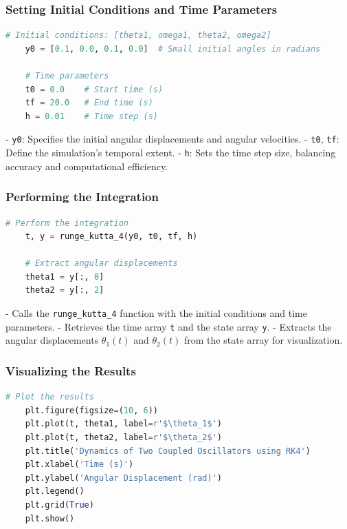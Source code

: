 \documentclass[12pt]{report} %
\begin{document}
    \subsubsection{Setting Initial Conditions and Time Parameters}
    
    \begin{lstlisting}[language=Python, caption={Initial Conditions and Time Parameters}, label={lst:initial_conditions}]
    # Initial conditions: [theta1, omega1, theta2, omega2]
    y0 = [0.1, 0.0, 0.1, 0.0]  # Small initial angles in radians
    
    # Time parameters
    t0 = 0.0    # Start time (s)
    tf = 20.0   # End time (s)
    h = 0.01    # Time step (s)
    \end{lstlisting}
    
    - \texttt{y0}: Specifies the initial angular displacements and angular velocities.
    - \texttt{t0}, \texttt{tf}: Define the simulation's temporal extent.
    - \texttt{h}: Sets the time step size, balancing accuracy and computational efficiency.
    
    \subsubsection{Performing the Integration}
    
    \begin{lstlisting}[language=Python, caption={Performing the Integration}, label={lst:perform_integration}]
    # Perform the integration
    t, y = runge_kutta_4(y0, t0, tf, h)
    
    # Extract angular displacements
    theta1 = y[:, 0]
    theta2 = y[:, 2]
    \end{lstlisting}
    
    - Calls the \texttt{runge\_kutta\_4} function with the initial conditions and time parameters.
    - Retrieves the time array \texttt{t} and the state array \texttt{y}.
    - Extracts the angular displacements \( \theta_1(t) \) and \( \theta_2(t) \) from the state array for visualization.
    
    \subsubsection{Visualizing the Results}
    
    \begin{lstlisting}[language=Python, caption={Plotting the Results}, label={lst:plot_results}]
    # Plot the results
    plt.figure(figsize=(10, 6))
    plt.plot(t, theta1, label=r'$\theta_1$')
    plt.plot(t, theta2, label=r'$\theta_2$')
    plt.title('Dynamics of Two Coupled Oscillators using RK4')
    plt.xlabel('Time (s)')
    plt.ylabel('Angular Displacement (rad)')
    plt.legend()
    plt.grid(True)
    plt.show()
    \end{lstlisting}
    
\end{document}
